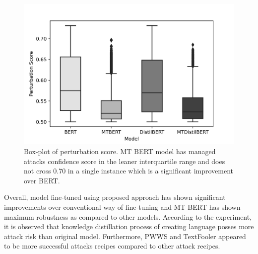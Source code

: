 \documentclass[%
	BCOR=8mm, %
	DIV=12,
	toc=bibliography, %
	toc=listof, %
	oneside, %
	egregdoesnotlikesansseriftitles, %
	]{scrbook}
\begin{document}
\begin{figure}[H]
    \centering
    \includegraphics[width=.6\linewidth]{img/PertScoreDist}
    \caption[Box-plot of perturbation score]{\small Box-plot of perturbation score. MT BERT model has managed attacks confidence score in the leaner interquartile range and does not cross 0.70 in a single instance which is a significant improvement over BERT.}
    \label{fig:pertscoredist}
\end{figure}
 Overall, model fine-tuned using proposed approach has shown significant improvements over conventional way of fine-tuning and MT BERT has shown maximum robustness as compared to other models. According to the experiment, it is observed that knowledge distillation process of creating language posses more attack risk than original model. Furthermore, PWWS and TextFooler appeared to be more successful attacks recipes compared to other attack recipes. 

\end{document}
